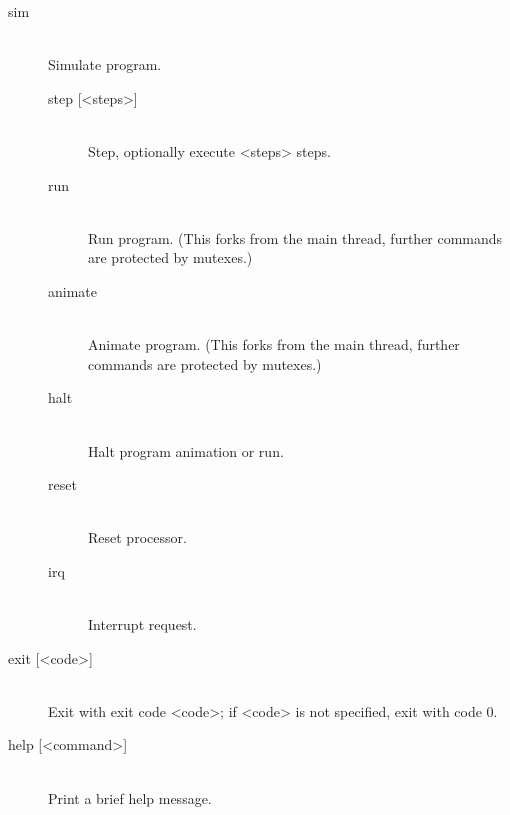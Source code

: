 \begin{description}
            \item[sim]~\\
                Simulate program.
                \begin{description}
                    \item[step {[}<steps>{]}]~\\
                        Step, optionally execute <steps> steps.
                    \item[run]~\\
                        Run program. (This forks from the main thread, further commands are protected by mutexes.)
                    \item[animate]~\\
                        Animate program. (This forks from the main thread, further commands are protected by mutexes.)
                    \item[halt]~\\
                        Halt program animation or run.
                    \item[reset]~\\
                        Reset processor.
                    \item[irq]~\\
                        Interrupt request.
                \end{description}

            \item[exit {[}<code>{]}]~\\
                Exit with exit code <code>; if <code> is not specified, exit with code 0.

            \item[help {[}<command>{]}]~\\
                Print a brief help message.
        \end{description}

